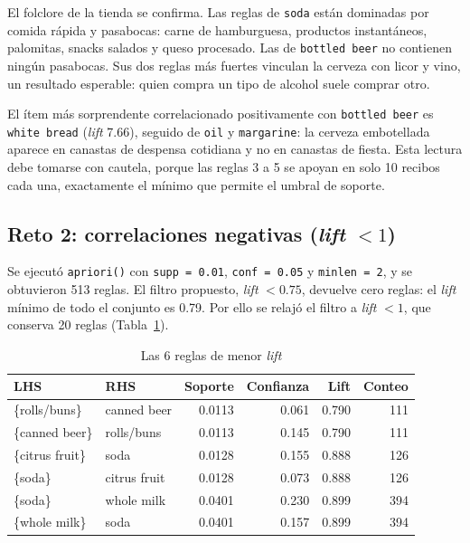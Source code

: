 \documentclass[11pt,a4paper]{article}
\begin{document}
El folclore de la tienda se confirma. Las reglas de \texttt{soda} están dominadas por comida
rápida y pasabocas: carne de hamburguesa, productos instantáneos, palomitas, snacks salados y
queso procesado. Las de \texttt{bottled beer} no contienen ningún pasabocas. Sus dos reglas
más fuertes vinculan la cerveza con licor y vino, un resultado esperable: quien compra un
tipo de alcohol suele comprar otro.

El ítem más sorprendente correlacionado positivamente con \texttt{bottled beer} es
\texttt{white bread} (\emph{lift} 7.66), seguido de \texttt{oil} y \texttt{margarine}: la
cerveza embotellada aparece en canastas de despensa cotidiana y no en canastas de fiesta.
Esta lectura debe tomarse con cautela, porque las reglas 3 a 5 se apoyan en solo 10 recibos
cada una, exactamente el mínimo que permite el umbral de soporte.

\subsection{Reto 2: correlaciones negativas (\emph{lift} $< 1$)}

Se ejecutó \texttt{apriori()} con \texttt{supp = 0.01}, \texttt{conf = 0.05} y
\texttt{minlen = 2}, y se obtuvieron 513 reglas. El filtro propuesto, \emph{lift} $< 0.75$,
devuelve cero reglas: el \emph{lift} mínimo de todo el conjunto es 0.79. Por ello se relajó
el filtro a \emph{lift} $< 1$, que conserva 20 reglas (Tabla~\ref{tab:neg}).

\begin{table}[H]
  \centering
  \caption{Las 6 reglas de menor \emph{lift}}
  \label{tab:neg}
  \begin{tabular}{llrrrr}
    \toprule
    LHS & RHS & Soporte & Confianza & Lift & Conteo \\
    \midrule
    \{rolls/buns\} & canned beer & 0.0113 & 0.061 & 0.790 & 111 \\
    \{canned beer\} & rolls/buns & 0.0113 & 0.145 & 0.790 & 111 \\
    \{citrus fruit\} & soda & 0.0128 & 0.155 & 0.888 & 126 \\
    \{soda\} & citrus fruit & 0.0128 & 0.073 & 0.888 & 126 \\
    \{soda\} & whole milk & 0.0401 & 0.230 & 0.899 & 394 \\
    \{whole milk\} & soda & 0.0401 & 0.157 & 0.899 & 394 \\
    \bottomrule
  \end{tabular}
\end{table}
\end{document}
